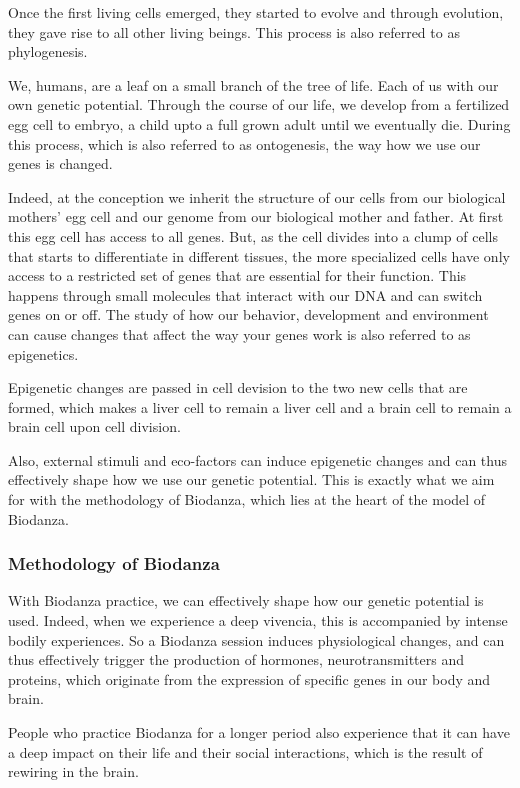 \documentclass[
]{article}
\begin{document}
Once the first living cells emerged, they started to evolve and through evolution, they gave rise to all other living beings. This process is also referred to as phylogenesis.

We, humans, are a leaf on a small branch of the tree of life. Each of us with our own genetic potential. Through the course of our life, we develop from a fertilized egg cell to embryo, a child upto a full grown adult until we eventually die. During this process, which is also referred to as ontogenesis, the way how we use our genes is changed.

Indeed, at the conception we inherit the structure of our cells from our biological mothers' egg cell and our genome from our biological mother and father. At first this egg cell has access to all genes. But, as the cell divides into a clump of cells that starts to differentiate in different tissues, the more specialized cells have only access to a restricted set of genes that are essential for their function. This happens through small molecules that interact with our DNA and can switch genes on or off.
The study of how our behavior, development and environment can cause changes that affect the way your genes work is also referred to as epigenetics.

Epigenetic changes are passed in cell devision to the two new cells that are formed, which makes a liver cell to remain a liver cell and a brain cell to remain a brain cell upon cell division.

Also, external stimuli and eco-factors can induce epigenetic changes and can thus effectively shape how we use our genetic potential. This is exactly what we aim for with the methodology of Biodanza, which lies at the heart of the model of Biodanza.

\hypertarget{methodology-of-biodanza}{%
\subsubsection{Methodology of Biodanza}\label{methodology-of-biodanza}}

With Biodanza practice, we can effectively shape how our genetic potential is used. Indeed, when we experience a deep vivencia, this is accompanied by intense bodily experiences. So a Biodanza session induces physiological changes, and can thus effectively trigger the production of hormones, neurotransmitters and proteins, which originate from the expression of specific genes in our body and brain.

People who practice Biodanza for a longer period also experience that it can have a deep impact on their life and their social interactions, which is the result of rewiring in the brain.
\end{document}
